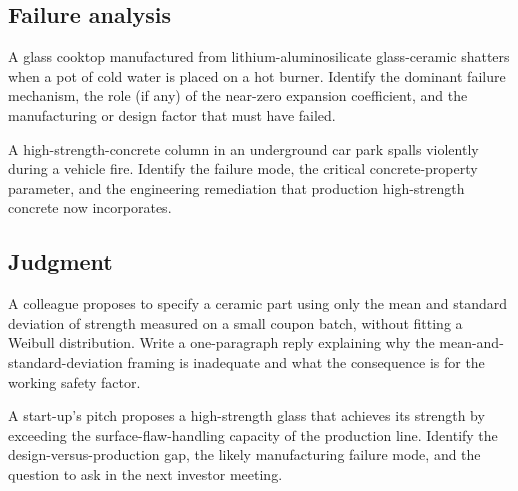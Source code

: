 \subsection*{Failure analysis}

\begin{exercise}
A glass cooktop manufactured from lithium-aluminosilicate
glass-ceramic shatters when a pot of cold water is placed on a hot
burner. Identify the dominant failure mechanism, the role (if any) of
the near-zero expansion coefficient, and the manufacturing or design
factor that must have failed.
\end{exercise}

\begin{exercise}
A high-strength-concrete column in an underground car park spalls
violently during a vehicle fire. Identify the failure mode, the
critical concrete-property parameter, and the engineering remediation
that production high-strength concrete now incorporates.
\end{exercise}

\subsection*{Judgment}

\begin{exercise}
A colleague proposes to specify a ceramic part using only the
mean and standard deviation of strength measured on a small coupon
batch, without fitting a Weibull distribution. Write a one-paragraph
reply explaining why the mean-and-standard-deviation framing is
inadequate and what the consequence is for the working safety factor.
\end{exercise}

\begin{exercise}
A start-up's pitch proposes a high-strength glass that achieves its
strength by exceeding the surface-flaw-handling capacity of the
production line. Identify the design-versus-production gap, the
likely manufacturing failure mode, and the question to ask in the next
investor meeting.
\end{exercise}
